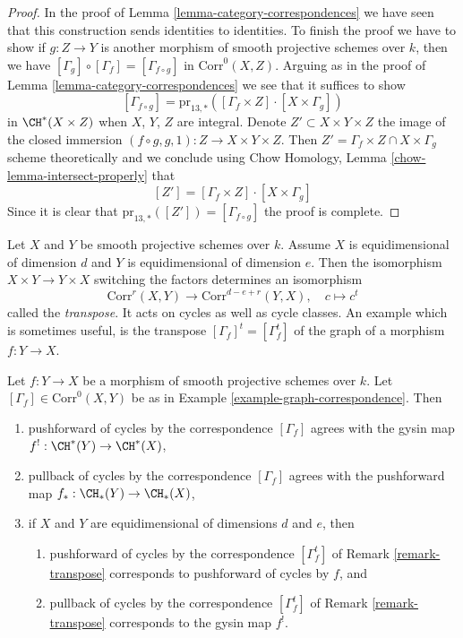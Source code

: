 \begin{proof}
In the proof of Lemma \ref{lemma-category-correspondences}
we have seen that this construction sends identities to
identities. To finish the proof we have to show if $g : Z \to Y$
is another morphism of smooth projective schemes over $k$, then we have
$[\Gamma_g] \circ [\Gamma_f] = [\Gamma_{f \circ g}]$ in
$\text{Corr}^0(X, Z)$. Arguing as in the proof of
Lemma \ref{lemma-category-correspondences} we see that it
suffices to show
$$
[\Gamma_{f \circ g}] =
\text{pr}_{13, *}([\Gamma_f \times Z] \cdot [X \times \Gamma_g])
$$
in $\CH^*(X \times Z)$ when $X$, $Y$, $Z$ are integral.
Denote $Z' \subset X \times Y \times Z$ the image of the closed immersion
$(f \circ g, g, 1) : Z \to X \times Y \times Z$.
Then $Z' = \Gamma_f \times Z \cap X \times \Gamma_g$
scheme theoretically and we conclude using
Chow Homology, Lemma \ref{chow-lemma-intersect-properly}
that
$$
[Z'] = [\Gamma_f \times Z] \cdot [X \times \Gamma_g]
$$
Since it is clear that $\text{pr}_{13, *}([Z']) = [\Gamma_{f \circ g}]$
the proof is complete.
\end{proof}

\begin{remark}
\label{remark-transpose}
Let $X$ and $Y$ be smooth projective schemes over $k$.
Assume $X$ is equidimensional of dimension $d$ and
$Y$ is equidimensional of dimension $e$. Then the isomorphism
$X \times Y \to Y \times X$ switching the factors determines
an isomorphism
$$
\text{Corr}^r(X, Y) \longrightarrow \text{Corr}^{d - e + r}(Y, X),\quad
c \longmapsto c^t
$$
called the {\it transpose}. It acts on cycles as well as cycle classes.
An example which is sometimes useful, is the transpose
$[\Gamma_f]^t = [\Gamma_f^t]$ of the graph of a morphism $f : Y \to X$.
\end{remark}

\begin{lemma}
\label{lemma-functor-and-cycles}
Let $f : Y \to X$ be a morphism of smooth projective schemes over $k$.
Let $[\Gamma_f] \in \text{Corr}^0(X, Y)$ be as in
Example \ref{example-graph-correspondence}. Then
\begin{enumerate}
\item pushforward of cycles by the correspondence $[\Gamma_f]$
agrees with the gysin map $f^! : \CH^*(Y) \to \CH^*(X)$,
\item pullback of cycles by the correspondence $[\Gamma_f]$
agrees with the pushforward map $f_* : \CH_*(Y) \to \CH_*(X)$,
\item if $X$ and $Y$ are equidimensional of dimensions $d$ and $e$,
then
\begin{enumerate}
\item pushforward of cycles by the correspondence
$[\Gamma_f^t]$ of Remark \ref{remark-transpose}
corresponds to pushforward of cycles by $f$, and
\item pullback of cycles by the correspondence
$[\Gamma_f^t]$ of Remark \ref{remark-transpose}
corresponds to the gysin map $f^!$.
\end{enumerate}
\end{enumerate}
\end{lemma}

